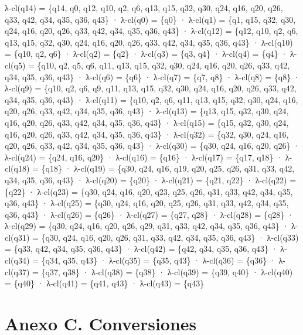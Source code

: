 λ-cl(q14) = \{q14, q0, q12, q10, q2, q6, q13, q15, q32, q30, q24, q16, q20, q26, q33, q42, q34, q35, q36, q43\} · λ-cl(q0) = \{q0\} · λ-cl(q1) = \{q1, q15, q32, q30, q24, q16, q20, q26, q33, q42, q34, q35, q36, q43\} · λ-cl(q12) = \{q12, q10, q2, q6, q13, q15, q32, q30, q24, q16, q20, q26, q33, q42, q34, q35, q36, q43\} · λ-cl(q10) = \{q10, q2, q6\} · λ-cl(q2) = \{q2\} · λ-cl(q3) = \{q3, q4\} · λ-cl(q4) = \{q4\} · λ-cl(q5) = \{q10, q2, q5, q6, q11, q13, q15, q32, q30, q24, q16, q20, q26, q33, q42, q34, q35, q36, q43\} · λ-cl(q6) = \{q6\} · λ-cl(q7) = \{q7, q8\} · λ-cl(q8) = \{q8\} · λ-cl(q9) = \{q10, q2, q6, q9, q11, q13, q15, q32, q30, q24, q16, q20, q26, q33, q42, q34, q35, q36, q43\} · λ-cl(q11) = \{q10, q2, q6, q11, q13, q15, q32, q30, q24, q16, q20, q26, q33, q42, q34, q35, q36, q43\} · λ-cl(q13) = \{q13, q15, q32, q30, q24, q16, q20, q26, q33, q42, q34, q35, q36, q43\} · λ-cl(q15) = \{q15, q32, q30, q24, q16, q20, q26, q33, q42, q34, q35, q36, q43\} · λ-cl(q32) = \{q32, q30, q24, q16, q20, q26, q33, q42, q34, q35, q36, q43\} · λ-cl(q30) = \{q30, q24, q16, q20, q26\} · λ-cl(q24) = \{q24, q16, q20\} · λ-cl(q16) = \{q16\} · λ-cl(q17) = \{q17, q18\} · λ-cl(q18) = \{q18\} · λ-cl(q19) = \{q30, q24, q16, q19, q20, q25, q26, q31, q33, q42, q34, q35, q36, q43\} · λ-cl(q20) = \{q20\} · λ-cl(q21) = \{q21, q22\} · λ-cl(q22) = \{q22\} · λ-cl(q23) = \{q30, q24, q16, q20, q23, q25, q26, q31, q33, q42, q34, q35, q36, q43\} · λ-cl(q25) = \{q30, q24, q16, q20, q25, q26, q31, q33, q42, q34, q35, q36, q43\} · λ-cl(q26) = \{q26\} · λ-cl(q27) = \{q27, q28\} · λ-cl(q28) = \{q28\} · λ-cl(q29) = \{q30, q24, q16, q20, q26, q29, q31, q33, q42, q34, q35, q36, q43\} · λ-cl(q31) = \{q30, q24, q16, q20, q26, q31, q33, q42, q34, q35, q36, q43\} · λ-cl(q33) = \{q33, q42, q34, q35, q36, q43\} · λ-cl(q42) = \{q42, q34, q35, q36, q43\} · λ-cl(q34) = \{q34, q35, q43\} · λ-cl(q35) = \{q35, q43\} · λ-cl(q36) = \{q36\} · λ-cl(q37) = \{q37, q38\} · λ-cl(q38) = \{q38\} · λ-cl(q39) = \{q39, q40\} · λ-cl(q40) = \{q40\} · λ-cl(q41) = \{q41, q43\} · λ-cl(q43) = \{q43\}

\hypertarget{anexo-c.-conversiones}{%
\section{Anexo C. Conversiones}\label{anexo-c.-conversiones}}

